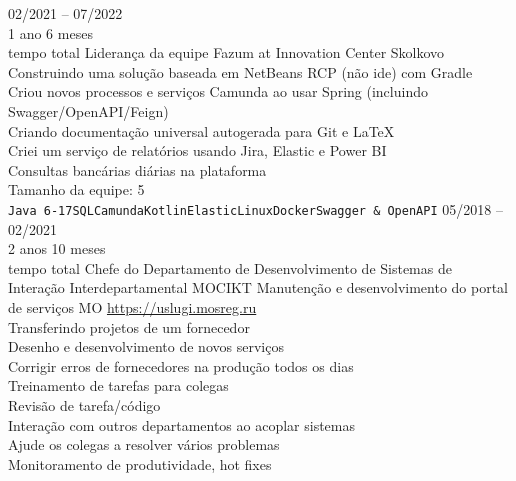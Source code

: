 


\begin{entrylist}
    \entry
    {02/2021 -- 07/2022\\\footnotesize{1 ano 6 meses\\tempo total}}
    {Liderança da equipe}
    {Fazum at Innovation Center Skolkovo}
    {
        Construindo uma solução baseada em NetBeans RCP (não ide) com Gradle \\
    Criou novos processos e serviços Camunda ao usar Spring (incluindo Swagger/OpenAPI/Feign) \\
    Criando documentação universal autogerada para Git e LaTeX \\
    Criei um serviço de relatórios usando Jira, Elastic e Power BI \\
    Consultas bancárias diárias na plataforma \\
    Tamanho da equipe: 5 \\
    \texttt{Java 6-17}\slashsep\texttt{SQL}\slashsep\texttt{Camunda}\slashsep\texttt{Kotlin}\slashsep\texttt{Elastic}\slashsep\texttt{Linux}\slashsep\texttt{Docker}\slashsep\texttt{Swagger \& OpenAPI}
    }
    \entry
    {05/2018 -- 02/2021\\\footnotesize{2 anos 10 meses\\tempo total}}
    {Chefe do Departamento de Desenvolvimento de Sistemas de Interação Interdepartamental}
    {MOCIKT}
    {
        Manutenção e desenvolvimento do portal de serviços MO \url{https://uslugi.mosreg.ru} \\
        Transferindo projetos de um fornecedor \\
        Desenho e desenvolvimento de novos serviços \\
        Corrigir erros de fornecedores na produção todos os dias \\
        Treinamento de tarefas para colegas \\
        Revisão de tarefa/código \\
        Interação com outros departamentos ao acoplar sistemas \\
        Ajude os colegas a resolver vários problemas \\
        Monitoramento de produtividade, hot fixes \\
}
\end{entrylist}
